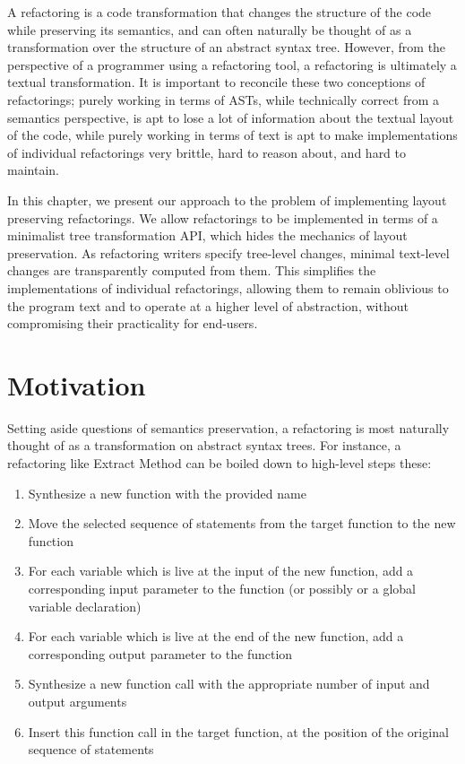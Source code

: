 A refactoring is a code transformation that changes the structure of the code
while preserving its semantics, and can often naturally be thought of as a
transformation over the structure of an abstract syntax tree. However, from
the perspective of a programmer using a refactoring tool, a refactoring is
ultimately a textual transformation. It is important to reconcile these two
conceptions of refactorings; purely working in terms of ASTs, while
technically correct from a semantics perspective, is apt to lose a lot
of information about the textual layout of the code, while purely working
in terms of text is apt to make implementations of individual refactorings
very brittle, hard to reason about, and hard to maintain.

In this chapter, we present our approach to the problem of implementing layout
preserving refactorings. We allow refactorings to be implemented in terms of a
minimalist tree transformation API, which hides the mechanics of layout
preservation. As refactoring writers specify tree-level changes, minimal
text-level changes are transparently computed from them. This simplifies the
implementations of individual refactorings, allowing them to remain oblivious
to the program text and to operate at a higher level of abstraction, without
compromising their practicality for end-users.

\section{Motivation}

Setting aside questions of semantics preservation, a refactoring is most
naturally thought of as a transformation on abstract syntax trees. For
instance, a refactoring like Extract Method can be boiled down to high-level
steps these:

\begin{enumerate}
  \item Synthesize a new function with the provided name
  \item Move the selected sequence of statements from the target function to
    the new function
  \item For each variable which is live at the input of the new function, add a
    corresponding input parameter to the function (or possibly or a global
    variable declaration)
  \item For each variable which is live at the end of the new function, add a
    corresponding output parameter to the function
  \item Synthesize a new function call with the appropriate number of input and
    output arguments
  \item Insert this function call in the target function, at the position of
    the original sequence of statements
\end{enumerate}

